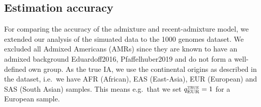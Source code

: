 \documentclass[12pt]{article}
\theoremstyle{definition}
\newcommand\crule[3][black]{\textcolor{#1}{\rule{#2}{#3}}}
\begin{document}

\subsection{Estimation accuracy}
For comparing the accuracy of the admixture and recent-admixture
model, we extended our analysis of the simuated data to the 1000
genomes dataset. We excluded all Admixed Americans (AMRs) since they
are known to have an admixed background \cite{article}{Eduardoff2016,
  Pfaffelhuber2019} and do not form a well-defined own group. As the
true IA, we use the continental origins as described in the dataset,
i.e.\ we have AFR (African), EAS (East-Asia), EUR (European) and SAS
(South Asian) samples. This means e.g.\ that we set
$q^{\text{\sc true}}_{\text{EUR}}=1$ for a European sample.
\end{document}
